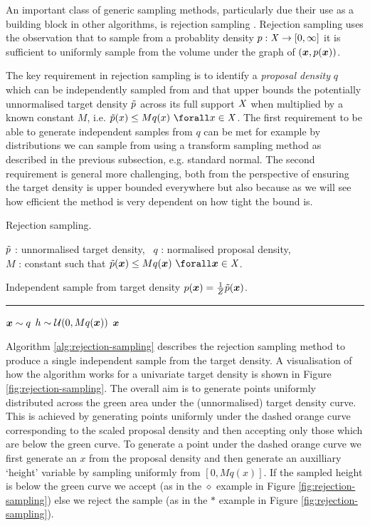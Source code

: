 An important class of generic sampling methods, particularly due their use as a building block in other algorithms, is rejection sampling \citep{vonneumann1951various}. Rejection sampling uses the observation that to sample from a probablity density $p : \mathit{X} \to [0, \infty]$ it is sufficient to uniformly sample from the volume under the graph of $\lpa\vct{x}, \tgtdens(\vct{x})\rpa$.

The key requirement in rejection sampling is to identify a \emph{proposal density} $q$ which can be independently sampled from and that upper bounds the potentially unnormalised target density $\tilde{p}$ across its full support $\mathit{X}$ when multiplied by a known constant $M$, i.e. $\utgtdens(x) \leq M q(x) ~\forall x \in \set{X}$. The first requirement to be able to generate independent samples from $q$ can be met for example by distributions we can sample from using a transform sampling method as described in the previous subsection, e.g. standard normal. The second requirement is general more challenging, both from the perspective of ensuring the target density is upper bounded everywhere but also because as we will see how efficient the method is very dependent on how tight the bound is.

\begin{algorithm}[!t]
\caption{Rejection sampling.}
\label{alg:rejection-sampling}
\begin{algorithmic}
\small
    \Require
    $\tilde{p}$ : unnormalised target density,~
    $q$ : normalised proposal density, \\
    $M$ : constant such that $\utgtdens(\vct{x}) \leq Mq(\vct{x}) ~\forall \vct{x} \in \set{X}$.
    \Ensure\raggedright
    Independent sample from target density $p(\boldsymbol{x}) = \frac{1}{Z} \tilde{p}(\boldsymbol{x})$.
\end{algorithmic}
\hrule
\small
\begin{algorithmic}[1]
  \Repeat
    \State $\boldsymbol{x} \sim q$ 
    \State $h \sim \mathcal{U}(0,Mq(\boldsymbol{x}))$
  \State \Return $\boldsymbol{x}$
\end{algorithmic}
\end{algorithm}

Algorithm \ref{alg:rejection-sampling} describes the rejection sampling method to produce a single independent sample from the target density. A visualisation of how the algorithm works for a univariate target density is shown in Figure \ref{fig:rejection-sampling}. The overall aim is to generate points uniformly distributed across the green area under the (unnormalised) target density curve. This is achieved by generating points uniformly under the dashed orange curve corresponding to the scaled proposal density and then accepting only those which are below the green curve. To generate a point under the dashed orange curve we first generate an $x$ from the proposal density and then generate an auxilliary `height' variable by sampling uniformly from $[0, Mq(x)]$. If the sampled height is below the green curve we accept (as in the $\diamond$ example in Figure \ref{fig:rejection-sampling}) else we reject the sample (as in the $*$ example in Figure \ref{fig:rejection-sampling}).

